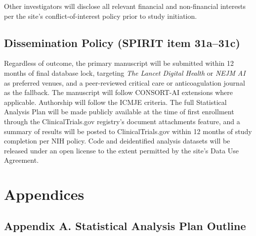 \documentclass[11pt]{article}
\begin{document}
Other investigators will disclose all relevant financial and non-financial interests per the site's conflict-of-interest policy prior to study initiation.

\subsection{Dissemination Policy (SPIRIT item 31a--31c)}

Regardless of outcome, the primary manuscript will be submitted within 12 months of final database lock, targeting \emph{The Lancet Digital Health} or \emph{NEJM AI} as preferred venues, and a peer-reviewed critical care or anticoagulation journal as the fallback. The manuscript will follow CONSORT-AI extensions where applicable. Authorship will follow the ICMJE criteria. The full Statistical Analysis Plan will be made publicly available at the time of first enrollment through the ClinicalTrials.gov registry's document attachments feature, and a summary of results will be posted to ClinicalTrials.gov within 12 months of study completion per NIH policy. Code and deidentified analysis datasets will be released under an open license to the extent permitted by the site's Data Use Agreement.

\section{Appendices}

\subsection{Appendix A. Statistical Analysis Plan Outline}
\end{document}

